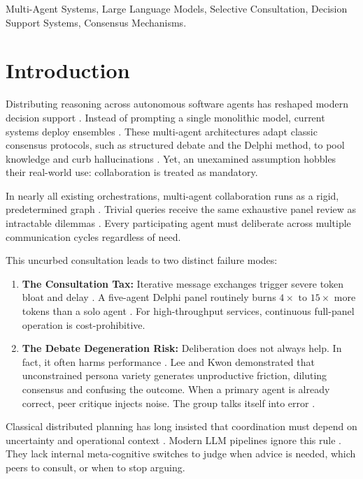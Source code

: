 \documentclass[conference]{IEEEtran}
\begin{document}
\begin{IEEEkeywords}
Multi-Agent Systems, Large Language Models, Selective Consultation, Decision Support Systems, Consensus Mechanisms.
\end{IEEEkeywords}

\section{Introduction}
Distributing reasoning across autonomous software agents has reshaped modern decision support \cite{canese2021, cardoso2021}. Instead of prompting a single monolithic model, current systems deploy ensembles \cite{maldonado2024, li2024}. These multi-agent architectures adapt classic consensus protocols, such as structured debate and the Delphi method, to pool knowledge and curb hallucinations \cite{raghavendra2026, zhu2026, lee2026}. Yet, an unexamined assumption hobbles their real-world use: collaboration is treated as mandatory.

In nearly all existing orchestrations, multi-agent collaboration runs as a rigid, predetermined graph \cite{maldonado2024, raghavendra2026}. Trivial queries receive the same exhaustive panel review as intractable dilemmas \cite{li2024, zhu2026}. Every participating agent must deliberate across multiple communication cycles regardless of need.

This uncurbed consultation leads to two distinct failure modes:
\begin{enumerate}
    \item \textbf{The Consultation Tax:} Iterative message exchanges trigger severe token bloat and delay \cite{zhu2026, acharya2025}. A five-agent Delphi panel routinely burns $4\times\text{ to }15\times$ more tokens than a solo agent \cite{li2024, jiang2026sciml}. For high-throughput services, continuous full-panel operation is cost-prohibitive.
    \item \textbf{The Debate Degeneration Risk:} Deliberation does not always help. In fact, it often harms performance \cite{lee2026}. Lee and Kwon \cite{lee2026} demonstrated that unconstrained persona variety generates unproductive friction, diluting consensus and confusing the outcome. When a primary agent is already correct, peer critique injects noise. The group talks itself into error \cite{lee2026, nguyen2026}.
\end{enumerate}

Classical distributed planning has long insisted that coordination must depend on uncertainty and operational context \cite{goncalves2022, asik2023}. Modern LLM pipelines ignore this rule \cite{raghavendra2026, zhu2026}. They lack internal meta-cognitive switches to judge when advice is needed, which peers to consult, or when to stop arguing.
\end{document}
